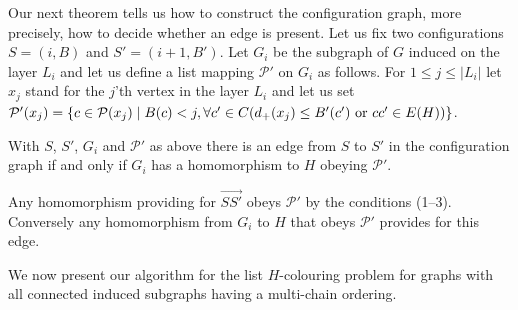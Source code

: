 \documentclass[12pt]{llncs}
\begin{document}
Our next theorem tells us how to construct the configuration graph,
more precisely, how to decide whether an edge is present. Let us fix
two configurations $S=(i,B)$ and $S'=(i+1,B')$. Let $G_i$ be
the subgraph of $G$ induced on the layer $L_i$ and let us define a
list mapping $\mathcal P'$ on $G_i$ as follows. For $1\le j\le|L_i|$
let $x_j$ stand for the $j$'th vertex in the layer $L_i$ and let us
set $\mathcal P'(x_j)=\{c\in\mathcal P(x_j)\mid B(c)<j, \forall c'\in C(d_+(x_j)\le
B'(c')\hbox{ or }cc'\in E(H))\}$.

\begin{theorem}\label{const}
With $S$, $S'$, $G_i$ and $\mathcal P'$ as above there is an edge from
$S$ to $S'$ in the configuration graph if and only if $G_i$ has a homomorphism
to $H$ obeying $\mathcal P'$.
\end{theorem}

\begin{my_proof}
Any homomorphism providing for $\overrightarrow{SS'}$ obeys $\mathcal P'$ by
the conditions (1--3). Conversely any homomorphism from $G_i$ to $H$ that
obeys $\mathcal P'$ provides for this edge.
\end{my_proof}

We now present our algorithm for the list $H$-colouring problem for graphs with
all connected induced subgraphs having a multi-chain ordering. 
\end{document}
